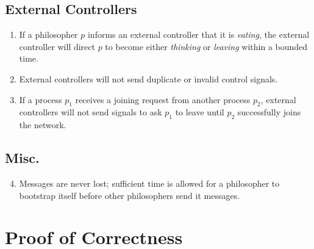 \documentclass[11pt]{article}
\begin{document}
\subsection{External Controllers}
\begin{enumerate}[E1]
\item If a philosopher $p$ informs an external controller that it is \emph{eating}, the external controller will direct $p$ to become either \emph{thinking} or \emph{leaving} within a bounded time.

\item External controllers will not send duplicate or invalid control signals.

\item \label{Assump:E_guarantees_nodes_entering_network} If a process $p_1$ receives a joining request from another process $p_2$, external controllers will not send signals to ask $p_1$ to leave until $p_2$ successfully joins the network.
\end{enumerate}

\subsection{Misc.}
\begin{enumerate}[E1]
\setcounter{enumi}{3}
\item \label{Assump:message_never_lost} Messages are never lost; sufficient time is allowed for a philosopher to bootstrap itself before other philosophers send it messages.
\end{enumerate}


\section{Proof of Correctness}
\end{document}
